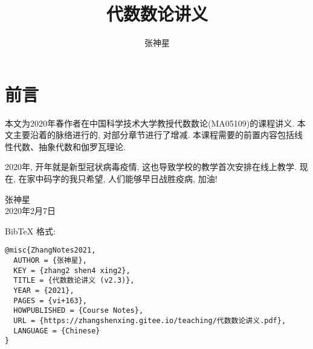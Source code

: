\documentclass[cn,11pt,chinese,twoside,openright]{elegantbookmath}
\title{代数数论讲义}
\author{张神星}
\institute{合肥工业大学}
\date{\zhtoday}
\begin{document}
\maketitle
\frontmatter

\chapter*{前言}
本文为2020年春作者在中国科学技术大学教授代数数论(MA05109)的课程讲义.
本文主要沿着\cite{Neukirch1999}的脉络进行的, 对部分章节进行了增减.
本课程需要的前置内容包括线性代数、抽象代数和伽罗瓦理论.

2020年, 开年就是新型冠状病毒疫情, 这也导致学校的教学首次安排在线上教学. 现在, 在家中码字的我只希望, 人们能够早日战胜疫病, 加油!

\vskip 0.5cm
\begin{flushright}
张神星\\
2020年2月7日
\end{flushright}


\vskip 0.5cm

\noindent BibTeX 格式:
\begin{lstlisting}
@misc{ZhangNotes2021,
  AUTHOR = {张神星},
  KEY = {zhang2 shen4 xing2},
  TITLE = {代数数论讲义 (v2.3)},
  YEAR = {2021},
  PAGES = {vi+163},
  HOWPUBLISHED = {Course Notes},
  URL = {https://zhangshenxing.gitee.io/teaching/代数数论讲义.pdf},
  LANGUAGE = {Chinese}
}
\end{lstlisting}

\tableofcontents




\mainmatter






\appendix
\renewcommand{\chaptermark}[1]{\markboth{\appendixname \, #1\,}{}}



\backmatter

\end{document}
